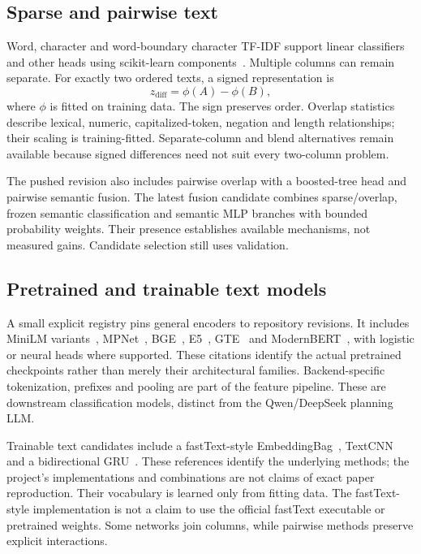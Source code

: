 \documentclass[11pt,a4paper]{article}
\begin{document}
\subsection{Sparse and pairwise text}
Word, character and word-boundary character TF-IDF support linear classifiers and other heads using scikit-learn components~\cite{sklearn}. Multiple columns can remain separate. For exactly two ordered texts, a signed representation is
\begin{equation}z_{\mathrm{diff}}=\phi(A)-\phi(B),\end{equation}
where $\phi$ is fitted on training data. The sign preserves order. Overlap statistics describe lexical, numeric, capitalized-token, negation and length relationships; their scaling is training-fitted. Separate-column and blend alternatives remain available because signed differences need not suit every two-column problem.

The pushed revision also includes pairwise overlap with a boosted-tree head and pairwise semantic fusion. The latest fusion candidate combines sparse/overlap, frozen semantic classification and semantic MLP branches with bounded probability weights. Their presence establishes available mechanisms, not measured gains. Candidate selection still uses validation.

\subsection{Pretrained and trainable text models}
A small explicit registry pins general encoders to repository revisions. It includes MiniLM variants~\cite{minilm}, MPNet~\cite{mpnet}, BGE~\cite{bge}, E5~\cite{e5}, GTE~\cite{gte} and ModernBERT~\cite{modernbert}, with logistic or neural heads where supported. These citations identify the actual pretrained checkpoints rather than merely their architectural families. Backend-specific tokenization, prefixes and pooling are part of the feature pipeline. These are downstream classification models, distinct from the Qwen/DeepSeek planning LLM.

Trainable text candidates include a fastText-style EmbeddingBag~\cite{fasttext}, TextCNN~\cite{textcnn} and a bidirectional GRU~\cite{gru}. These references identify the underlying methods; the project's implementations and combinations are not claims of exact paper reproduction. Their vocabulary is learned only from fitting data. The fastText-style implementation is not a claim to use the official fastText executable or pretrained weights. Some networks join columns, while pairwise methods preserve explicit interactions.
\end{document}
